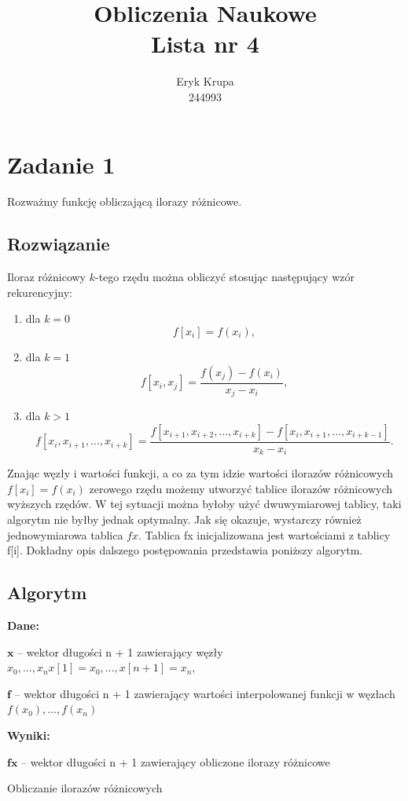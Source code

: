 \documentclass[12pt]{article}
\title{Obliczenia Naukowe \\ \large Lista nr 4}
\author{Eryk Krupa \\ 244993}
\date{}
\begin{document}
\renewcommand{\familydefault}{\sfdefault}
\maketitle
\newpage


\section{Zadanie 1}
Rozważmy funkcję obliczającą ilorazy różnicowe.

\subsection{Rozwiązanie}
Iloraz różnicowy $k$-tego rzędu można obliczyć stosując następujący wzór rekurencyjny:
\begin{enumerate}
\item dla $k = 0$  $$f[x_i] = f(x_i),$$
\item dla $k = 1$  $$f[x_i,x_j] = \frac{f(x_j) - f(x_i)}{x_j - x_i},$$  
\item dla $k > 1$  $$f[x_i,x_{i+1}, \ldots, x_{i+k}] = \frac{f[x_{i+1},x_{i+2}, \ldots, x_{i+k}] - f[x_{i}, x_{i+1}, \ldots, x_{i+k-1}]}{x_k - x_i}.$$
\end{enumerate}
Znając węzły i wartości funkcji, a co za tym idzie wartości ilorazów różnicowych  $f[x_i] = f(x_i)$ zerowego rzędu możemy utworzyć tablice ilorazów różnicowych wyższych rzędów. W tej sytuacji można byłoby użyć dwuwymiarowej tablicy, taki algorytm nie byłby jednak optymalny. Jak się okazuje, wystarczy również jednowymiarowa tablica $fx$. Tablica fx inicjalizowana jest wartościami z tablicy f[i]. Dokładny opis dalszego postępowania przedstawia poniższy algorytm.

\subsection{Algorytm}
\textbf{Dane:}\par
$\textbf{x}$ – wektor długości n + 1 zawierający węzły $x_0, ..., x_n
x[1]=x_0,..., x[n+1]=x_n,$\par
$\textbf{f}$ – wektor długości n + 1 zawierający wartości interpolowanej
funkcji w węzłach $f(x_0), ..., f(x_n)$\newline\par
\textbf{Wyniki:}\par
$\textbf{fx}$ – wektor długości n + 1 zawierający obliczone ilorazy różnicowe
\begin{algorithm}[h]
	\DontPrintSemicolon
\caption{Obliczanie ilorazów różnicowych}
\end{algorithm} 
\end{document}
